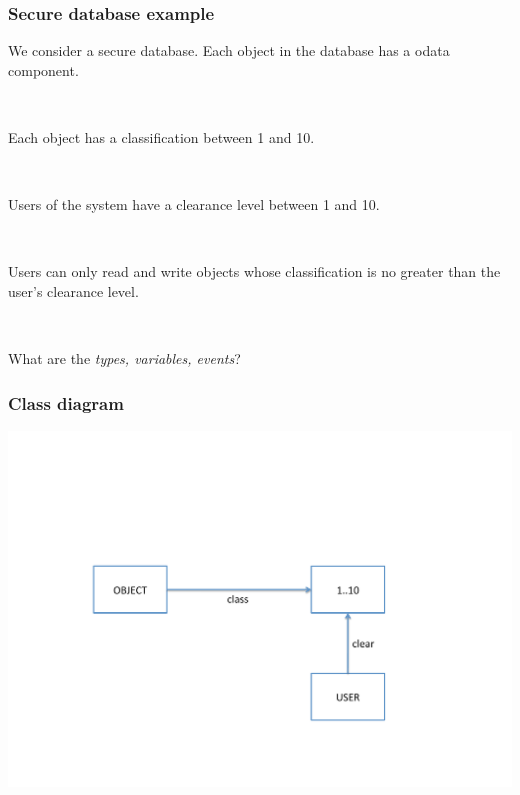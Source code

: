 \documentclass{beamer}
\begin{document}
\begin{frame}

\frametitle{Secure database example}



We consider a  secure database. Each object in the database has a
 odata component.

~

Each object has a classification between 1 and 10.

~

Users of the system have a clearance level between 1 and 10.

~

Users can only read and write objects whose classification is no
greater than the user's clearance level.

~

What are the \textit{types, variables, events}?





\end{frame}






\begin{frame} \frametitle{Class diagram}

  \begin{center}
    \includegraphics[scale=.5]{sdb4}
  \end{center}

\end{frame}
\end{document}
